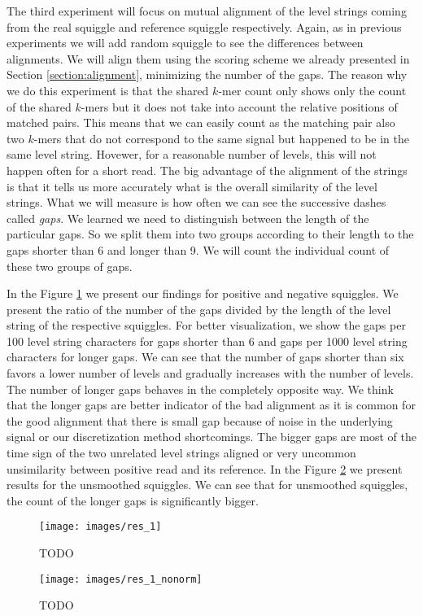 The third experiment will focus on mutual alignment of the level strings coming from
the real squiggle and reference squiggle respectively. Again, as in previous experiments
we will add random squiggle to see the differences between alignments.
We will align them using the scoring scheme we already presented in Section \ref{section:alignment},
minimizing the number of the gaps. The reason why we do this experiment is that the shared $k$-mer count only
shows only the count of the shared $k$-mers but it does not take into account the relative positions of matched pairs.
This means that we can easily count as the matching pair also two $k$-mers that
do not correspond to the same signal but happened to be in the same level string.
Hovewer, for a reasonable number of levels, this will not happen often for a short read.
The big advantage of the alignment of the strings is that it tells us more accurately
what is the overall similarity of the level strings. What we will measure is
how often we can see the successive dashes called \textit{gaps}. We learned we need
to distinguish between the length of the particular gaps. So we split
them into two groups according to their length to the gaps shorter than 6 and longer than 9.
We will count the individual count of these two groups of gaps.

In the Figure \ref{obr:res_1} we present our findings for positive
and negative squiggles. We present the ratio of the number of the gaps divided
by the length of the level string of the respective squiggles. For better visualization,
we show the gaps per 100 level string characters for gaps shorter than 6 and gaps
per 1000 level string characters for longer gaps. We can see that the number of gaps
shorter than six favors a lower number of levels and gradually increases with the number
of levels. The number of longer gaps behaves in the completely opposite way. We think
that the longer gaps are better indicator of the bad alignment as it is common for
the good alignment that there is small gap because of noise in the underlying signal
or our discretization method shortcomings. The bigger gaps are most of the time sign of the two
unrelated level strings aligned or very uncommon unsimilarity between positive read
and its reference. In the Figure \ref{obr:res_1_nonorm} we present results for the unsmoothed
squiggles. We can see that for unsmoothed squiggles, the count of the longer gaps
is significantly bigger.

\begin{figure}
\centerline{\texttt{[image: images/res\_1]}}
\caption[TODO]{TODO}
\label{obr:res_1}
\end{figure}

\begin{figure}
\centerline{\texttt{[image: images/res\_1\_nonorm]}}
\caption[TODO]{TODO}
\label{obr:res_1_nonorm}
\end{figure}
